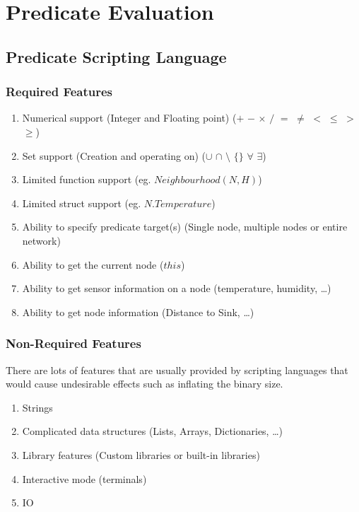 \section{Predicate Evaluation}

\subsection{Predicate Scripting Language}

\subsubsection{Required Features}

\begin{enumerate}
	\item Numerical support (Integer and Floating point) ($+$ $-$ $\times$ $/$ $=$ $\neq$ $<$ $\leq$ $>$ $\geq$)
	\item Set support (Creation and operating on) ($\cup$ $\cap$ $\setminus$ $\{\}$ $\forall$ $\exists$)
	\item Limited function support (eg. $Neighbourhood(N, H)$)
	\item Limited struct support (eg. $N.Temperature$)
	\item Ability to specify predicate target(s) (Single node, multiple nodes or entire network)
	\item Ability to get the current node ($this$)
	\item Ability to get sensor information on a node (temperature, humidity, \ldots)
	\item Ability to get node information (Distance to Sink, \ldots)
\end{enumerate}

\subsubsection{Non-Required Features}

There are lots of features that are usually provided by scripting languages that would cause undesirable effects such as inflating the binary size.

\begin{enumerate}
	\item Strings
	\item Complicated data structures (Lists, Arrays, Dictionaries, \ldots)
	\item Library features (Custom libraries or built-in libraries)
	\item Interactive mode (terminals)
	\item IO
\end{enumerate}



